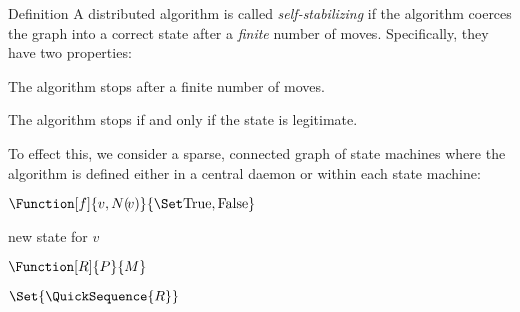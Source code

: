 \documentclass{beamer}
\begin{document}
\begin{frame}[fragile,t]
\begin{columns}[t]
\begin{column}{.45\textwidth}
      \begin{block}{Definition}
        A distributed algorithm is called \textit{self-stabilizing} if
        the algorithm coerces the graph into a correct state after a
        \emph{finite} number of moves.  Specifically, they have two properties:
        \begin{description}[algorithmMMMM]
        \item[convergence] The algorithm stops after a finite number of moves.
        \item[closure] The algorithm stops if and only if the state is legitimate.
        \end{description}
        To effect this, we consider a sparse, connected graph of state machines where
          the algorithm is defined either in a central daemon or within each state machine:
        \begin{description}[algorithmMMMM]
        \item[predicate] $\Function[f]{v, N(\!v)}{\SetBoolean}$
        \item[move] new state for $v$
        \item[rule] $\Function[R]{P}{M}$
        \item[algorithm] $\Set{\QuickSequence{R}}$
        \end{description}
        \begin{center}
\end{center}
\end{block}
\end{column}
\end{columns}
\end{frame}
\end{document}
